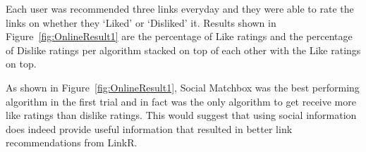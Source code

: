 Each user was recommended three links everyday and they were able to
rate the links on whether they `Liked' or `Disliked' it. Results shown
in Figure~\ref{fig:OnlineResult1} are the percentage of Like ratings
and the percentage of Dislike ratings per algorithm stacked on top of
each other with the Like ratings on top.

As shown in Figure~\ref{fig:OnlineResult1}, Social Matchbox was the
best performing algorithm in the first trial and in fact was the only
algorithm to get receive more like ratings than dislike ratings. This
would suggest that using social information does indeed provide useful
information that resulted in better link recommendations from LinkR.

\begin{figure}[t!]
\centering
{}

\end{figure}
